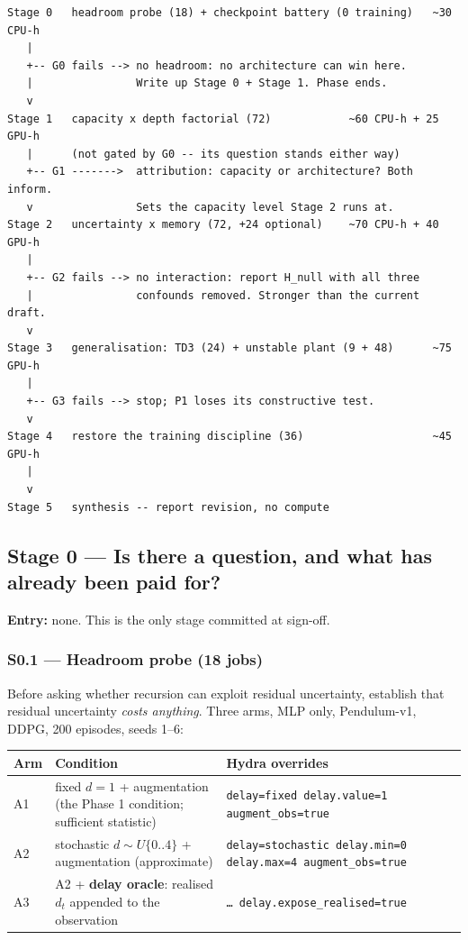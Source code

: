 \documentclass[11pt]{article}
\newcommand{\code}[1]{\texttt{\small #1}}
\begin{document}
\begin{Verbatim}[fontsize=\footnotesize,frame=single,framesep=7pt,rulecolor=\color{gray}]
Stage 0   headroom probe (18) + checkpoint battery (0 training)   ~30 CPU-h
   |
   +-- G0 fails --> no headroom: no architecture can win here.
   |                Write up Stage 0 + Stage 1. Phase ends.
   v
Stage 1   capacity x depth factorial (72)            ~60 CPU-h + 25 GPU-h
   |      (not gated by G0 -- its question stands either way)
   +-- G1 ------->  attribution: capacity or architecture? Both inform.
   v                Sets the capacity level Stage 2 runs at.
Stage 2   uncertainty x memory (72, +24 optional)    ~70 CPU-h + 40 GPU-h
   |
   +-- G2 fails --> no interaction: report H_null with all three
   |                confounds removed. Stronger than the current draft.
   v
Stage 3   generalisation: TD3 (24) + unstable plant (9 + 48)      ~75 GPU-h
   |
   +-- G3 fails --> stop; P1 loses its constructive test.
   v
Stage 4   restore the training discipline (36)                    ~45 GPU-h
   |
   v
Stage 5   synthesis -- report revision, no compute
\end{Verbatim}

\subsection{Stage 0 --- Is there a question, and what has already been paid for?}

\textbf{Entry:} none. This is the only stage committed at sign-off.

\subsubsection{S0.1 --- Headroom probe (18 jobs)}

Before asking whether recursion can exploit residual uncertainty, establish that residual uncertainty \emph{costs anything}. Three arms, MLP only, Pendulum-v1, DDPG, 200 episodes, seeds 1--6:

\begin{center}\small
\begin{tabular}{@{}lp{}p{}@{}}
\toprule
\textbf{Arm} & \textbf{Condition} & \textbf{Hydra overrides} \\
\midrule
A1 & fixed $d{=}1$ + augmentation (the Phase 1 condition; sufficient statistic) & \code{delay=fixed delay.value=1 augment\_obs=true} \\
A2 & stochastic $d \sim U\{0..4\}$ + augmentation (approximate) & \code{delay=stochastic delay.min=0 delay.max=4 augment\_obs=true} \\
A3 & A2 + \textbf{delay oracle}: realised $d_t$ appended to the observation & \code{\dots\ delay.expose\_realised=true} \\
\bottomrule
\end{tabular}
\end{center}
\end{document}
